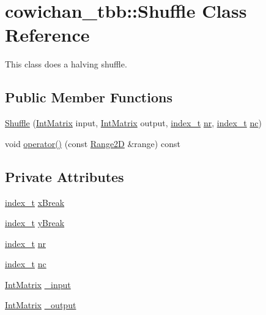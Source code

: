 \hypertarget{classcowichan__tbb_1_1_shuffle}{
\section{cowichan\_\-tbb::Shuffle Class Reference}
\label{classcowichan__tbb_1_1_shuffle}
}
This class does a halving shuffle.  


\subsection*{Public Member Functions}
\begin{CompactItemize}
\item 
\hyperlink{classcowichan__tbb_1_1_shuffle_76e886c3ce66eb96f5202a4d30b2d207}{Shuffle} (\hyperlink{cowichan_8hpp_82321152ddeeefe9c61350a42ed9e7af}{IntMatrix} input, \hyperlink{cowichan_8hpp_82321152ddeeefe9c61350a42ed9e7af}{IntMatrix} output, \hyperlink{cowichan_8hpp_5b04577d5d21124855deaad298595371}{index\_\-t} \hyperlink{classcowichan__tbb_1_1_shuffle_45a3363e8d41126dbbe70b6dc491f210}{nr}, \hyperlink{cowichan_8hpp_5b04577d5d21124855deaad298595371}{index\_\-t} \hyperlink{classcowichan__tbb_1_1_shuffle_c8e1f9b9f2c51041c677fbd98bc08e17}{nc})
\item 
void \hyperlink{classcowichan__tbb_1_1_shuffle_8fd5ad3e9928c89c44c134af274e51a7}{operator()} (const \hyperlink{cowichan__tbb_8hpp_e591b8e6980ddc5982ee22655da2ab8e}{Range2D} \&range) const 
\end{CompactItemize}
\subsection*{Private Attributes}
\begin{CompactItemize}
\item 
\hyperlink{cowichan_8hpp_5b04577d5d21124855deaad298595371}{index\_\-t} \hyperlink{classcowichan__tbb_1_1_shuffle_a592c8516247d32fe1d29da5a5702522}{xBreak}
\item 
\hyperlink{cowichan_8hpp_5b04577d5d21124855deaad298595371}{index\_\-t} \hyperlink{classcowichan__tbb_1_1_shuffle_61e454d5681e079269c80786e53600c4}{yBreak}
\item 
\hyperlink{cowichan_8hpp_5b04577d5d21124855deaad298595371}{index\_\-t} \hyperlink{classcowichan__tbb_1_1_shuffle_45a3363e8d41126dbbe70b6dc491f210}{nr}
\item 
\hyperlink{cowichan_8hpp_5b04577d5d21124855deaad298595371}{index\_\-t} \hyperlink{classcowichan__tbb_1_1_shuffle_c8e1f9b9f2c51041c677fbd98bc08e17}{nc}
\item 
\hyperlink{cowichan_8hpp_82321152ddeeefe9c61350a42ed9e7af}{IntMatrix} \hyperlink{classcowichan__tbb_1_1_shuffle_c4b8c943de6b9cf612aa86ec9fc8a5c4}{\_\-input}
\item 
\hyperlink{cowichan_8hpp_82321152ddeeefe9c61350a42ed9e7af}{IntMatrix} \hyperlink{classcowichan__tbb_1_1_shuffle_e176ad327a461904b6a4e7bc5e0cff97}{\_\-output}
\end{CompactItemize}


